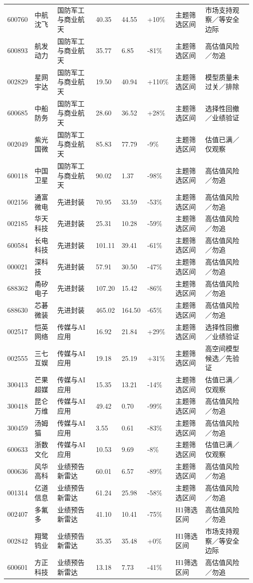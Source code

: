\begin{longtable}{L{1.05cm}L{1.55cm}L{1.75cm}R{0.90cm}R{1.05cm}R{0.90cm}L{1.75cm}L{2.45cm}}
600760 & 中航沈飞 & 国防军工与商业航天 & 40.35 & 44.55 & +10\% & 主题筛选区间 & 市场支持观察／等安全边际 \\
600893 & 航发动力 & 国防军工与商业航天 & 35.77 & 6.85 & -81\% & 主题筛选区间 & 高估值风险／勿追 \\
002829 & 星网宇达 & 国防军工与商业航天 & 19.50 & 40.94 & +110\% & 主题筛选区间 & 模型质量未过关／排除 \\
600685 & 中船防务 & 国防军工与商业航天 & 28.60 & 36.52 & +28\% & 主题筛选区间 & 选择性回撤／业绩验证 \\
002049 & 紫光国微 & 国防军工与商业航天 & 85.83 & 77.79 & -9\% & 主题筛选区间 & 估值已满／仅观察 \\
600118 & 中国卫星 & 国防军工与商业航天 & 90.02 & 1.37 & -98\% & 主题筛选区间 & 高估值风险／勿追 \\
002156 & 通富微电 & 先进封装 & 70.95 & 33.59 & -53\% & 主题筛选区间 & 高估值风险／勿追 \\
002185 & 华天科技 & 先进封装 & 25.31 & 10.28 & -59\% & 主题筛选区间 & 高估值风险／勿追 \\
600584 & 长电科技 & 先进封装 & 101.11 & 39.41 & -61\% & 主题筛选区间 & 高估值风险／勿追 \\
000021 & 深科技 & 先进封装 & 57.91 & 30.50 & -47\% & 主题筛选区间 & 高估值风险／勿追 \\
688362 & 甬矽电子 & 先进封装 & 107.20 & 15.42 & -86\% & 主题筛选区间 & 高估值风险／勿追 \\
688630 & 芯碁微装 & 先进封装 & 465.02 & 164.50 & -65\% & 主题筛选区间 & 高估值风险／勿追 \\
002517 & 恺英网络 & 传媒与AI应用 & 16.92 & 21.84 & +29\% & 主题筛选区间 & 选择性回撤／业绩验证 \\
002555 & 三七互娱 & 传媒与AI应用 & 19.18 & 25.19 & +31\% & 主题筛选区间 & 高空间模型候选／先验证 \\
300413 & 芒果超媒 & 传媒与AI应用 & 15.35 & 13.21 & -14\% & 主题筛选区间 & 估值已满／仅观察 \\
300418 & 昆仑万维 & 传媒与AI应用 & 49.42 & 0.70 & -99\% & 主题筛选区间 & 高估值风险／勿追 \\
300459 & 汤姆猫 & 传媒与AI应用 & 3.55 & 0.61 & -83\% & 主题筛选区间 & 高估值风险／勿追 \\
600633 & 浙数文化 & 传媒与AI应用 & 10.53 & 9.69 & -8\% & 主题筛选区间 & 估值已满／仅观察 \\
000636 & 风华高科 & 业绩预告新雷达 & 60.01 & 6.57 & -89\% & 主题筛选区间 & 高估值风险／勿追 \\
001314 & 亿道信息 & 业绩预告新雷达 & 61.24 & 25.98 & -58\% & 主题筛选区间 & 高估值风险／勿追 \\
002407 & 多氟多 & 业绩预告新雷达 & 41.10 & 10.41 & -75\% & H1筛选区间 & 高估值风险／勿追 \\
002842 & 翔鹭钨业 & 业绩预告新雷达 & 35.35 & 35.48 & +0\% & H1筛选区间 & 市场支持观察／等安全边际 \\
600601 & 方正科技 & 业绩预告新雷达 & 13.18 & 7.73 & -41\% & H1筛选区间 & 高估值风险／勿追 \\
\bottomrule
\end{longtable}
\normalsize

